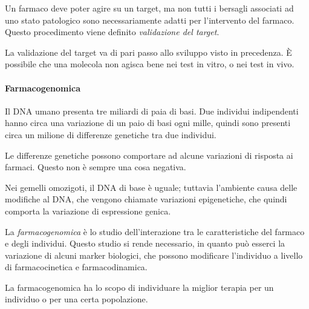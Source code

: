 
Un farmaco deve poter agire su un target, ma non tutti i bersagli
associati ad uno stato patologico sono necessariamente adatti per
l'intervento del farmaco. Questo procedimento viene definito
\emph{validazione del target}.

La validazione del target va di pari passo allo sviluppo visto in
precedenza. È possibile che una molecola non agisca bene nei test in
vitro, o nei test in vivo.

\paragraph{Farmacogenomica}

Il DNA umano presenta tre miliardi di paia di basi. Due individui
indipendenti hanno circa una variazione di un paio di basi ogni mille,
quindi sono presenti circa un milione di differenze genetiche tra due
individui.

Le differenze genetiche possono comportare ad alcune variazioni di
risposta ai farmaci. Questo non è sempre una cosa negativa.

Nei gemelli omozigoti, il DNA di base è uguale; tuttavia l'ambiente
causa delle modifiche al DNA, che vengono chiamate variazioni
epigenetiche, che quindi comporta la variazione di espressione genica.

La \emph{farmacogenomica} è lo studio dell'interazione tra le
caratteristiche del farmaco e degli individui. Questo studio si rende
necessario, in quanto può esserci la variazione di alcuni marker
biologici, che possono modificare l'individuo a livello di
farmacocinetica e farmacodinamica.

La farmacogenomica ha lo scopo di individuare la miglior terapia per un
individuo o per una certa popolazione.
